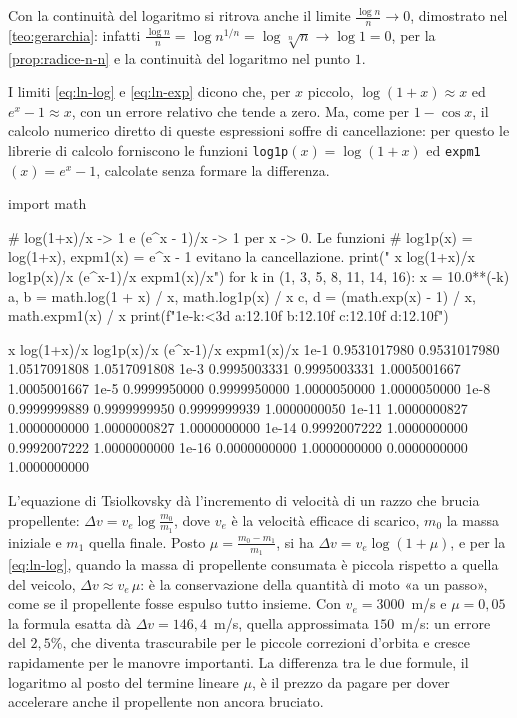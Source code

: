 \begin{osservazione}
Con la continuità del logaritmo si ritrova anche il limite $\frac{\log n}{n}\to0$,
dimostrato nel \cref{teo:gerarchia}: infatti
$\frac{\log n}{n}=\log n^{1/n}=\log\sqrt[n]n\to\log1=0$, per la \cref{prop:radice-n-n} e la
continuità del logaritmo nel punto $1$.
\end{osservazione}

I limiti \eqref{eq:ln-log} e \eqref{eq:ln-exp} dicono che, per $x$ piccolo,
$\log(1+x)\approx x$ ed $e^{x}-1\approx x$, con un errore relativo che tende a zero. Ma,
come per $1-\cos x$, il calcolo numerico diretto di queste espressioni soffre di
cancellazione: per questo le librerie di calcolo forniscono le funzioni
\texttt{log1p}$(x)=\log(1+x)$ ed \texttt{expm1}$(x)=e^{x}-1$, calcolate senza formare la
differenza.

\begin{python}
import math

# log(1+x)/x -> 1 e (e^x - 1)/x -> 1 per x -> 0. Le funzioni
# log1p(x) = log(1+x), expm1(x) = e^x - 1 evitano la cancellazione.
print("    x     log(1+x)/x   log1p(x)/x   (e^x-1)/x    expm1(x)/x")
for k in (1, 3, 5, 8, 11, 14, 16):
    x = 10.0**(-k)
    a, b = math.log(1 + x) / x, math.log1p(x) / x
    c, d = (math.exp(x) - 1) / x, math.expm1(x) / x
    print(f"1e-{k:<3d} {a:12.10f} {b:12.10f} {c:12.10f} {d:12.10f}")
\end{python}
\begin{risultato}
    x     log(1+x)/x   log1p(x)/x   (e^x-1)/x    expm1(x)/x
1e-1   0.9531017980 0.9531017980 1.0517091808 1.0517091808
1e-3   0.9995003331 0.9995003331 1.0005001667 1.0005001667
1e-5   0.9999950000 0.9999950000 1.0000050000 1.0000050000
1e-8   0.9999999889 0.9999999950 0.9999999939 1.0000000050
1e-11  1.0000000827 1.0000000000 1.0000000827 1.0000000000
1e-14  0.9992007222 1.0000000000 0.9992007222 1.0000000000
1e-16  0.0000000000 1.0000000000 0.0000000000 1.0000000000
\end{risultato}

\begin{idea}
L'equazione di Tsiolkovsky dà l'incremento di velocità di un razzo che brucia
propellente: $\Delta v=v_{e}\log\frac{m_{0}}{m_{1}}$, dove $v_{e}$ è la velocità efficace di
scarico, $m_{0}$ la massa iniziale e $m_{1}$ quella finale. Posto
$\mu=\frac{m_{0}-m_{1}}{m_{1}}$, si ha $\Delta v=v_{e}\log(1+\mu)$, e per la
\eqref{eq:ln-log}, quando la massa di propellente consumata è piccola rispetto a quella
del veicolo, $\Delta v\approx v_{e}\,\mu$: è la conservazione della quantità di moto «a
un passo», come se il propellente fosse espulso tutto insieme. Con $v_{e}=3000$~m/s e
$\mu=0{,}05$ la formula esatta dà $\Delta v=146{,}4$~m/s, quella approssimata $150$~m/s:
un errore del $2{,}5\%$, che diventa trascurabile per le piccole correzioni d'orbita e
cresce rapidamente per le manovre importanti. La differenza tra le due formule, il
logaritmo al posto del termine lineare $\mu$, è il prezzo da pagare per dover accelerare
anche il propellente non ancora bruciato.
\end{idea}

